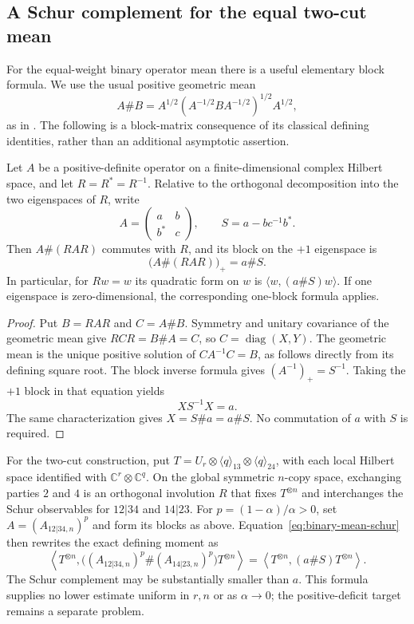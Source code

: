 \subsection{A Schur complement for the equal two-cut mean}
\label{subsec:binary-mean}

For the equal-weight binary operator mean there is a useful elementary
block formula. We use the usual positive geometric mean
\[
 A\#B=A^{1/2}(A^{-1/2}BA^{-1/2})^{1/2}A^{1/2},
\]
as in \cite[Remark~2.2(ii), equation~(39)]{BugarVrana2025}.
The following is a block-matrix consequence of its classical defining
identities, rather than an additional asymptotic assertion.

\begin{lemma}
\label{lem:binary-mean-schur}
Let $A$ be a positive-definite operator on a finite-dimensional complex
Hilbert space, and let $R=R^*=R^{-1}$. Relative to the orthogonal
decomposition into the two eigenspaces of $R$, write
\[
 A=\begin{pmatrix}a&b\\b^*&c\end{pmatrix},
 \qquad S=a-bc^{-1}b^*.
\]
Then $A\#(RAR)$ commutes with $R$, and its block on the $+1$
eigenspace is
\begin{equation}\label{eq:binary-mean-schur}
 \bigl(A\#(RAR)\bigr)_+=a\#S.
\end{equation}
In particular, for $Rw=w$ its quadratic form on $w$ is
$\langle w,(a\#S)w\rangle$. If one eigenspace is zero-dimensional,
the corresponding one-block formula applies.
\end{lemma}
\begin{proof}
Put $B=RAR$ and $C=A\#B$. Symmetry and unitary covariance of the
geometric mean give $RCR=B\#A=C$, so $C=\operatorname{diag}(X,Y)$.
The geometric mean is the unique positive solution of
$CA^{-1}C=B$, as follows directly from its defining square root.
The block inverse formula gives $(A^{-1})_+=S^{-1}$. Taking the
$+1$ block in that equation yields
\[
 XS^{-1}X=a.
\]
The same characterization gives $X=S\#a=a\#S$.
No commutation of $a$ with $S$ is required.
\end{proof}

For the two-cut construction, put
$T=U_r\otimes\langle q\rangle_{13}\otimes\langle q\rangle_{24}$,
with each local Hilbert space identified with
$\mathbb C^r\otimes\mathbb C^q$.
On the global symmetric $n$-copy space, exchanging parties $2$ and $4$
is an orthogonal involution $R$ that fixes $T^{\otimes n}$ and
interchanges the Schur observables for $12|34$ and $14|23$.
For $p=(1-\alpha)/\alpha>0$, set
$A=(A_{12|34,n})^p$ and form its blocks as above.
Equation~\eqref{eq:binary-mean-schur} then rewrites the exact defining
moment as
\[
 \left\langle T^{\otimes n},
  \bigl((A_{12|34,n})^p\#(A_{14|23,n})^p\bigr)T^{\otimes n}\right\rangle
 =\left\langle T^{\otimes n},(a\#S)T^{\otimes n}\right\rangle.
\]
The Schur complement may be substantially smaller than $a$.
This formula supplies no lower estimate uniform in $r,n$ or
as $\alpha\to0$; the positive-deficit target remains a separate problem.

